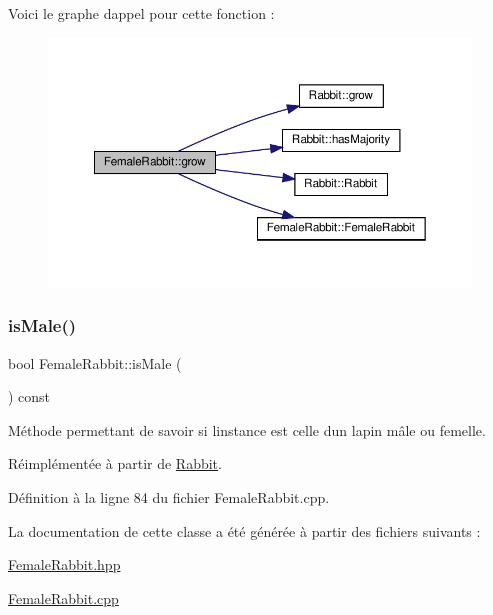 Voici le graphe d\textquotesingle{}appel pour cette fonction \+:
\nopagebreak
\begin{figure}[H]
\begin{center}
\leavevmode
\includegraphics[width=350pt]{classFemaleRabbit_ad938ea7eca97c53e89d11392b6856ebd_cgraph}
\end{center}
\end{figure}
\mbox{\label{classFemaleRabbit_a60250dbc3758c7d31537f13b4879fe33}} 
\subsubsection{\texorpdfstring{is\+Male()}{isMale()}}
{\footnotesize\ttfamily bool Female\+Rabbit\+::is\+Male (\begin{DoxyParamCaption}{ }\end{DoxyParamCaption}) const\hspace{0.3cm}{\ttfamily [virtual]}}



Méthode permettant de savoir si l\textquotesingle{}instance est celle d\textquotesingle{}un lapin mâle ou femelle. 



Réimplémentée à partir de \hyperlink{classRabbit_a913437a589519afdb9249825bd6f03bd}{Rabbit}.



Définition à la ligne 84 du fichier Female\+Rabbit.\+cpp.



La documentation de cette classe a été générée à partir des fichiers suivants \+:\begin{DoxyCompactItemize}
\item 
\hyperlink{FemaleRabbit_8hpp}{Female\+Rabbit.\+hpp}\item 
\hyperlink{FemaleRabbit_8cpp}{Female\+Rabbit.\+cpp}\end{DoxyCompactItemize}
